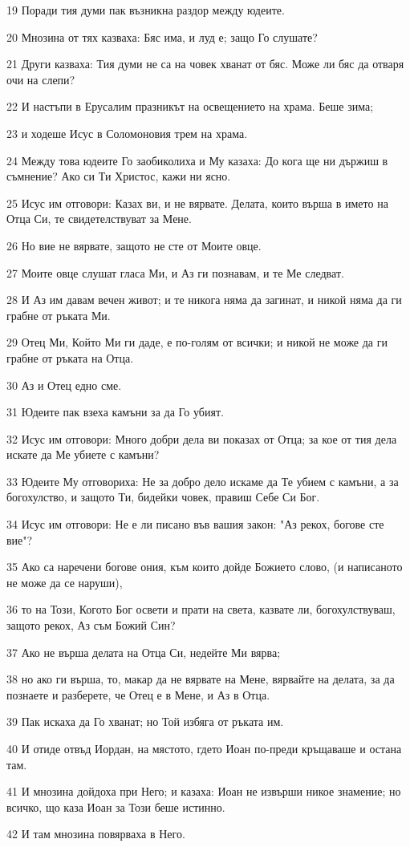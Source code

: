 \par 19 Поради тия думи пак възникна раздор между юдеите.
\par 20 Мнозина от тях казваха: Бяс има, и луд е; защо Го слушате?
\par 21 Други казваха: Тия думи не са на човек хванат от бяс. Може ли бяс да отваря очи на слепи?
\par 22 И настъпи в Ерусалим празникът на освещението на храма. Беше зима;
\par 23 и ходеше Исус в Соломоновия трем на храма.
\par 24 Между това юдеите Го заобиколиха и Му казаха: До кога ще ни държиш в съмнение? Ако си Ти Христос, кажи ни ясно.
\par 25 Исус им отговори: Казах ви, и не вярвате. Делата, които върша в името на Отца Си, те свидетелствуват за Мене.
\par 26 Но вие не вярвате, защото не сте от Моите овце.
\par 27 Моите овце слушат гласа Ми, и Аз ги познавам, и те Ме следват.
\par 28 И Аз им давам вечен живот; и те никога няма да загинат, и никой няма да ги грабне от ръката Ми.
\par 29 Отец Ми, Който Ми ги даде, е по-голям от всички; и никой не може да ги грабне от ръката на Отца.
\par 30 Аз и Отец едно сме.
\par 31 Юдеите пак взеха камъни за да Го убият.
\par 32 Исус им отговори: Много добри дела ви показах от Отца; за кое от тия дела искате да Ме убиете с камъни?
\par 33 Юдеите Му отговориха: Не за добро дело искаме да Те убием с камъни, а за богохулство, и защото Ти, бидейки човек, правиш Себе Си Бог.
\par 34 Исус им отговори: Не е ли писано във вашия закон: "Аз рекох, богове сте вие"?
\par 35 Ако са наречени богове ония, към които дойде Божието слово, (и написаното не може да се наруши),
\par 36 то на Този, Когото Бог освети и прати на света, казвате ли, богохулствуваш, защото рекох, Аз съм Божий Син?
\par 37 Ако не върша делата на Отца Си, недейте Ми вярва;
\par 38 но ако ги върша, то, макар да не вярвате на Мене, вярвайте на делата, за да познаете и разберете, че Отец е в Мене, и Аз в Отца.
\par 39 Пак искаха да Го хванат; но Той избяга от ръката им.
\par 40 И отиде отвъд Иордан, на мястото, гдето Иоан по-преди кръщаваше и остана там.
\par 41 И мнозина дойдоха при Него; и казаха: Иоан не извърши никое знамение; но всичко, що каза Иоан за Този беше истинно.
\par 42 И там мнозина повярваха в Него.

